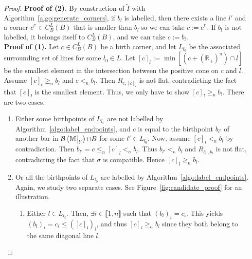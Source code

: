 \documentclass{article}
\newcommand{\barcode}[1]{ {\mathcal B}\left(#1\right) }
\newcommand{\R}{\mathbb{R}}
\newcommand{\Mbb}{\mathbb{M}}
\newcommand{\leqn}{\leq_n}
\newcommand{\geqn}{\geq_n}
\newcommand{\sln}{<_n}
\newcommand{\birthLcp}[1]{ C_B^L(#1) }
\newcommand{\rectangle}[2]{ R_{#1, #2} }
\newcommand\restr[2]{{  \left.\kern-\nulldelimiterspace #1 \vphantom{\big|} \right|_{#2}  }}
\newcommand{\birthptapprox}{b_l}
\begin{document}
\begin{proof}
	\noindent \textbf{Proof of (2).}
	By construction of $\tilde I$ with Algorithm~\ref{algo:generate_corners}, if $\birthptapprox$ is labelled, then there
	exists a line $l'$ and a corner $c^{l'}\in \birthLcp{B}$ that is smaller than $\birthptapprox$ so we can take $c:=c^{l'}$.
	If $\birthptapprox$ is not labelled, it belongs itself to $\birthLcp{B}$, and we can take $c:=\birthptapprox$. \\

	\noindent \textbf{Proof of (1).} Let $c \in \birthLcp{B}$ be a birth corner, and let $L_{l_0}$ be the associated surrounding set of lines for some $l_0 \in L$.
	Let $[c]_{l} :=\min \left[\left( c + \left( \R_+ \right)^n \right)\cap l\right]$ be the smallest element in
	the intersection between the positive cone on $c$ and $l$.
	Assume $[c]_{l}\geqn \birthptapprox$ and $c \sln \birthptapprox$. Then $\rectangle{c}{[c]_l}$ is not flat, contradicting the fact that $[c]_l$ is the smallest
	element. Thus, we only have to show $[c]_{l}\geqn \birthptapprox$.
	There are two cases.
	\begin{enumerate}
		\item Either some birthpoints of $L_{l_0}$ are not labelled by
			Algorithm~\ref{algo:label_endpoints}, and  $c$ is equal to the birthpoint $b_{l'}$ of another bar in $\barcode{\restr{\Mbb}{l'}}{\cap B}$ for some $l' \in L_{l_0}$.
			Now, assume $[c]_l \sln \birthptapprox$ by contradiction. Then $b_{l'}= c \leqn [c]_l \sln \birthptapprox$. Thus $b_{l'} \sln \birthptapprox$
			and $\rectangle{b_{l'}}{\birthptapprox}$ is not flat, contradicting
			{the fact that $\sigma$ is compatible}.
			Hence $[c]_l \geqn \birthptapprox$.

		\item Or all the birthpoints of $L_{l_0}$ are labelled by Algorithm~\ref{algo:label_endpoints}. Again, we study two separate cases. See Figure~\ref{fig:candidate_proof} for an illustration.
			\begin{enumerate}
				\item  Either $l\in L_{l_0}$. Then, $\exists i \in \llbracket 1,n\rrbracket$ such that $(\birthptapprox)_i=c_i$.
					This yields $(\birthptapprox)_i = c_i \le ([c]_l)_i$, and thus $[c]_l \geqn \birthptapprox$
					since they both belong to the same diagonal line $l$.


\end{enumerate}
\end{enumerate}
\end{proof}
\end{document}
